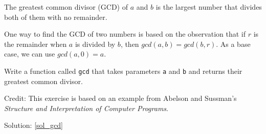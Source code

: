 \begin{exercise}
\label{gcd}

The greatest common divisor (GCD) of $a$ and $b$ is the largest number
that divides both of them with no remainder.  

One way to find the GCD of two numbers is based on the observation
that if $r$ is the remainder when $a$ is divided by $b$, then $gcd(a,
b) = gcd(b, r)$.  As a base case, we can use $gcd(a, 0) = a$.

Write a function called
\verb"gcd" that takes parameters {\tt a} and {\tt b}
and returns their greatest common divisor.

Credit: This exercise is based on an example from Abelson and
Sussman's {\em Structure and Interpretation of Computer Programs}.

Solution: \ref{sol_gcd}

\end{exercise}

